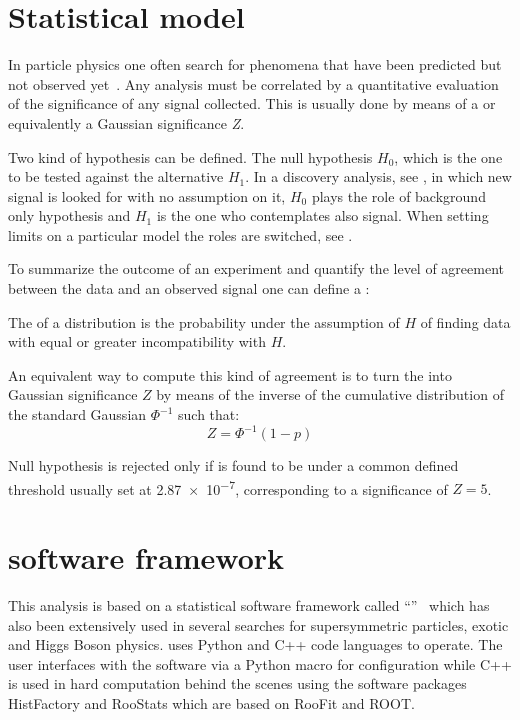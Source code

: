 \section{Statistical model}
In particle physics one often search for phenomena that have been predicted but not observed yet~\cite{Cowan}. Any analysis must be correlated by a quantitative evaluation of the significance of any signal collected. This is usually done by means of a \p or equivalently a Gaussian significance \emph{Z}.

Two kind of hypothesis can be defined. The null hypothesis $H_{0}$, which is the one to be tested against the alternative $H_{1}$. In a discovery analysis, see , in which new signal is looked for with no assumption on it, $H_{0}$ plays the role of background only hypothesis and $H_{1}$ is the one who contemplates also signal. When setting limits on a particular model the roles are switched, see .

To summarize the outcome of an experiment and quantify the level of agreement between the data and an observed signal one can define a \p:
\begin{definizione}
  The \p of a distribution is the probability under the assumption of $H$ of finding data with equal or greater incompatibility with $H$.
\end{definizione}

An equivalent way to compute this kind of agreement is to turn the \p into Gaussian significance $Z$ by means of the inverse of the cumulative distribution of the standard Gaussian $\Phi^{-1}$ such that:
\begin{equation}
  Z = \Phi^{-1}(1-p)
\end{equation}

Null hypothesis is rejected only if \p is found to be under a common defined threshold usually set at \num{2.87e-7}, corresponding to a significance of $Z=5$.

\section{\hf software framework}

This analysis is based on a statistical software framework called ``\hf''~\cite{baak:histfitter} which has also been extensively used in several searches for supersymmetric particles, exotic and Higgs Boson physics. 
\hf uses Python and C++ code languages to operate. The user interfaces with the software via a Python macro for configuration while C++ is used in hard computation behind the scenes using the software packages HistFactory and RooStats which are based on RooFit and ROOT.

